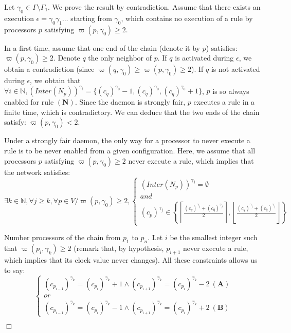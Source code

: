 \documentclass[11pt,english,letterpaper]{article}
\newenvironment{proof}{{\noindent\bf Proof. } }{{\hfill $\Box$}}
\begin{document}
\begin{proof}
Let $\gamma_{0}\in\Gamma\setminus\Gamma_{1}$. We prove the result by contradiction. Assume that there exists an execution $\epsilon=\gamma_{0}\gamma_{1}\ldots$ starting from $\gamma_{0}$, which contains no execution of a rule by processors $p$ satisfying $\varpi(p,\gamma_{0})\geq 2$.

In a first time, assume that one end of the chain (denote it by $p$) satisfies: $\varpi(p,\gamma_{0})\geq 2$. Denote $q$ the only neighbor of $p$. If $q$ is activated during $\epsilon$, we obtain a contradiction (since $\varpi(q,\gamma_{0})\geq\varpi(p,\gamma_{0})\geq 2$). If $q$ is not activated during $\epsilon$, we obtain that $\forall i\in\mathbb{N},\left(Inter(N_{p})\right)^{\gamma_{i}}=\{\left(c_{q}\right)^{\gamma_{0}}-1,\left(c_{q}\right)^{\gamma_{0}},\left(c_{q}\right)^{\gamma_{0}}+1\}$, $p$ is so always enabled for rule $\boldsymbol{(N)}$. Since the daemon is strongly fair, $p$ executes a rule in a finite time, which is contradictory. We can deduce that the two ends of the chain satisfy: $\varpi(p,\gamma_{0})<2$.

Under a strongly fair daemon, the only way for a processor to never execute a rule is to be never enabled from a given configuration. Here, we assume that all processors $p$ satisfying $\varpi(p,\gamma_{0})\geq 2$ never execute a rule, which implies that the network satisfies:
\[\exists k\in\mathbb{N},\forall j\geq k,\forall p\in V/\varpi(p,\gamma_{0})\geq 2,\begin{cases} \left(Inter(N_{p})\right)^{\gamma_{j}}=\emptyset\\
and\\
\left(c_{p}\right)^{\gamma_{j}}\in\left\{\left\lceil\frac{\left(c_{q}\right)^{\gamma_{j}}+\left(c_{\bar{q}}\right)^{\gamma_{j}}}{2}\right\rceil,
\left\lfloor\frac{\left(c_{q}\right)^{\gamma_{j}}+\left(c_{\bar{q}}\right)^{\gamma_{j}}}{2}\right\rfloor\right\}\end{cases}\]

Number processors of the chain from $p_{1}$ to $p_{n}$. Let $i$ be the smallest integer such that $\varpi(p_{i},\gamma_{k})\geq 2$ (remark that, by hypothesis, $p_{i+1}$ never execute a rule, which implies that its clock value never changes). All these constraints allows us to say:
\[\begin{cases}
\left(c_{p_{i-1}}\right)^{\gamma_{k}}=\left(c_{p_{i}}\right)^{\gamma_{k}}+1\wedge\left(c_{p_{i+1}}\right)^{\gamma_{k}}=\left(c_{p_{i}}\right)^{\gamma_{k}}-2\:\boldsymbol{(A)}\\
or\\		\left(c_{p_{i-1}}\right)^{\gamma_{k}}=\left(c_{p_{i}}\right)^{\gamma_{k}}-1\wedge\left(c_{p_{i+1}}\right)^{\gamma_{k}}=\left(c_{p_{i}}\right)^{\gamma_{k}}+2\:\boldsymbol{(B)}\end{cases}\]


\end{proof}
\end{document}
